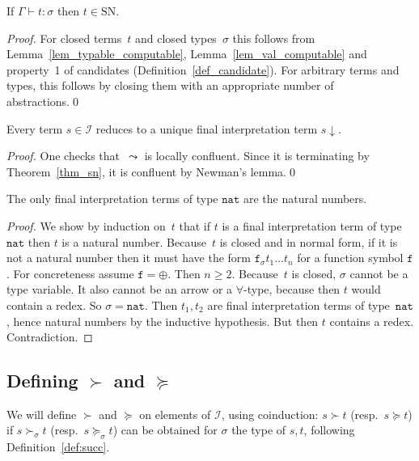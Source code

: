 \documentclass[runningheads,a4paper]{llncs}
\newcommand{\Iterms}{\mathcal{I}}
\newcommand{\nat}{\mathtt{nat}}
\newcommand{\SN}{\mathrm{SN}}
\newcommand{\proves}{\vdash}
\begin{document}
\begin{theorem}\label{thm_sn}
  If $\Gamma \proves t : \sigma$ then $t \in \SN$.
\end{theorem}

\begin{proof}
  For closed terms~$t$ and closed types~$\sigma$ this follows from
  Lemma~\ref{lem_typable_computable}, Lemma~\ref{lem_val_computable}
  and property~1 of candidates (Definition~\ref{def_candidate}). For
  arbitrary terms and types, this follows by closing them with an
  appropriate number of abstractions.\qed
\end{proof}

\begin{lemma}\label{lem_unique_final}
  Every term $s \in \Iterms$ reduces to a unique final interpretation
  term $s\downarrow$.
\end{lemma}

\begin{proof}
  One checks that~$\leadsto$ is locally confluent. Since it is
  terminating by Theorem~\ref{thm_sn}, it is confluent by Newman's
  lemma.\qed
\end{proof}

\begin{lemma}\label{lem_final_nat}
  The only final interpretation terms of type $\nat$ are the natural
  numbers.
\end{lemma}

\begin{proof}
  We show by induction on~$t$ that if $t$ is a final interpretation
  term of type~$\nat$ then $t$ is a natural number. Because~$t$ is
  closed and in normal form, if it is not a natural number then it
  must have the form $\mathtt{f}_\sigma t_1 \ldots t_n$ for a function
  symbol $\mathtt{f}$. For concreteness assume $\mathtt{f} =
  \oplus$. Then $n \ge 2$. Because~$t$ is closed, $\sigma$ cannot be a
  type variable. It also cannot be an arrow or a $\forall$-type,
  because then $t$ would contain a redex. So $\sigma=\nat$. Then
  $t_1,t_2$ are final interpretation terms of type~$\nat$, hence
  natural numbers by the inductive hypothesis. But then $t$ contains a
  redex. Contradiction.
\end{proof}

\subsection{Defining $\succ$ and $\succeq$}

We will define $\succ$ and $\succeq$ on elements of $\Iterms$, using
coinduction: $s \succ t$ (resp.\ $s \succeq t$) if $s \succ_\sigma t$
(resp.\ $s \succeq_\sigma t$) can be obtained for $\sigma$ the type of
$s,t$, following Definition~\ref{def:succ}.
\end{document}
